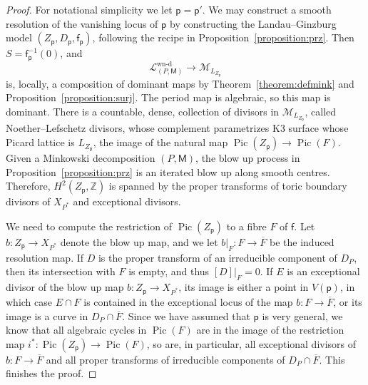 \documentclass[10pt]{amsart}
\numberwithin{equation}{section}
\theoremstyle{plain}
\theoremstyle{definition}
\theoremstyle{remark}
\DeclareMathOperator{\Pic}{Pic}
\begin{document}
\begin{proof}
  For notational simplicity we let \(\mathsf{p} = \mathsf{p}'\). We may construct a smooth resolution of the vanishing locus of \(\mathsf{p}\) by constructing the Landau--Ginzburg model \((Z_{\mathsf{p}},D_{\mathsf{p}}, \mathsf{f}_\mathsf{p})\), following the recipe in Proposition~\ref{proposition:prz}. Then \(S = \mathsf{f}_{\mathsf{p}}^{-1}(0)\), and
  \[
    \mathcal{L}^\text{wn-d}_{(P,\mathsf{M})}\rightarrow  \mathcal{M}_{L_{Z_\mathsf{p}}}
  \]
  is, locally, a composition of dominant maps by Theorem~\ref{theorem:defmink} and Proposition~\ref{proposition:surj}. The period map is algebraic, so this map is dominant. There is a countable, dense, collection of divisors in
  \(\mathcal{M}_{L_{Z_\mathsf{p}}}\), called Noether--Lefschetz divisors, whose complement parametrizes K3 surface whose Picard lattice is \(L_{Z_\mathsf{p}}\), the image of the natural map \(\Pic(Z_\mathsf{p})\rightarrow \Pic(F)\). Given a Minkowski decomposition \((P,{\mathsf{M}})\), the blow up process in Proposition~\ref{proposition:prz} is an iterated blow up along smooth centres. Therefore, \(H^2(Z_\mathsf{p},\mathbb{Z})\) is spanned by the proper transforms of toric boundary divisors of \(X_{P^*}\) and exceptional divisors.

  We need to compute the restriction of \(\Pic(Z_{\mathsf{p}})\) to a fibre \(F\) of \(\mathsf{f}\). Let \(b : Z_\mathsf{p} \rightarrow X_{P^*}\) denote the blow up map, and we let \(b|_F : F\rightarrow \overline{F}\) be the induced resolution map. If \(D\) is the proper transform of an irreducible component of \(D_P\), then its intersection with \(F\) is empty, and thus \([D]|_F = 0\). If \(E\) is an exceptional divisor of the blow up map \(b: Z_{\mathsf{p}}\rightarrow X_{P^*}\), its image is either a point in \(V(\mathsf{p})\), in which case \(E \cap F\) is contained in the exceptional locus of the map \(b : F\rightarrow \overline{F}\), or its image is a curve in \(D_P \cap \overline{F}\). Since we have assumed that \(\mathsf{p}\) is very general, we know that all algebraic cycles in \(\Pic(F)\) are in the image of the restriction map \(i^* \colon \Pic(Z_\mathsf{p})\rightarrow \Pic(F)\), so are, in particular, all exceptional divisors of \(b \colon F\rightarrow \overline{F}\) and all proper transforms of irreducible components of \(D_P\cap \overline{F}\). This finishes the proof.
\end{proof}
\end{document}
